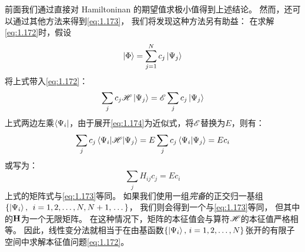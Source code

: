 前面我们通过直接对 Hamiltoninan 的期望值求极小值得到上述结论。
然而，还可以通过其他方法来得到\autoref{eq:1.173}，
我们将发现这种方法另有助益：
在求解\autoref{eq:1.172}时，假设
\begin{equation}
 \Ket{\Phi} = \sum_{j=1}^N c_j\Ket{\Psi_j}
 \label{eq:1.174}
\end{equation}
将上式带入\autoref{eq:1.172}：
\begin{equation}
 \sum_j c_j \mathscr{H}\Ket{\Psi_j} = \mathscr{E} \sum_j c_j \Ket{\Psi_j}
 \label{eq:1.175}
\end{equation}
上式两边左乘$\Bra{\Psi_i}$，由于展开\autoref{eq:1.174}为近似式，将$\mathscr{E}$替换为$E$，则有：
\[
\sum_j c_j \left\langle \Psi_i\middle\vert \mathscr{H} \middle\vert \Psi_j\right\rangle = E\sum_j c_j \left\langle \Psi_i \middle\vert \Psi_j \right\rangle = Ec_i
\]
或写为：
\begin{equation}
 \sum_j H_{ij}c_j = E c_i
 \label{eq:1.176}
\end{equation}
上式的矩阵式与\autoref{eq:1.173}等同。
如果我们使用一组\emph{完备}的正交归一基组 $\left\{\Ket{\Psi_i},
\right. \, i = 1, 2,\allowbreak \dots, N, N+1, \left.\dots \right\}$，
我们则会得到一个与\autoref{eq:1.173}等同，
但其中的$\mathbf{H}$为一个无限矩阵。
在这种情况下，矩阵的本征值会与算符$\mathscr{H}$的本征值严格相等。
因此，线性变分法就相当于在由基函数$\left\{\Ket{\Psi_i},\,i=1,2,\dots,N\right\}$张开的有限子空间中求解本征值问题\autoref{eq:1.172}。
 
 
 
